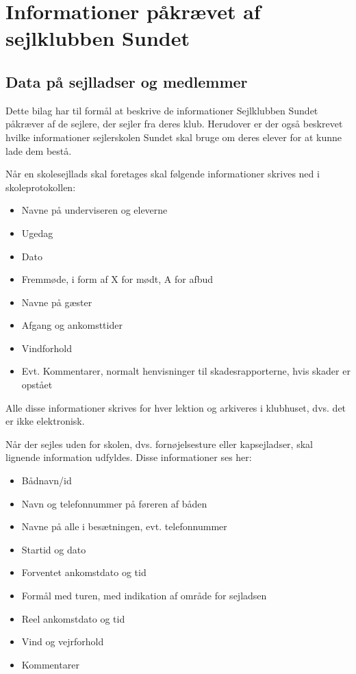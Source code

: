 \chapter{Informationer påkrævet af sejlklubben Sundet}\label{bilag:sundet}
\section{Data på sejlladser og medlemmer}

Dette bilag har til formål at beskrive de informationer Sejlklubben Sundet påkræver af de sejlere, der sejler fra deres klub. 
Herudover er der også beskrevet hvilke informationer sejlerskolen Sundet skal bruge om deres elever for at kunne lade dem bestå.

Når en skolesejllads skal foretages skal følgende informationer skrives ned i skoleprotokollen:

\begin{itemize}
	\item Navne på underviseren og eleverne
	\item Ugedag
	\item Dato
	\item Fremmøde, i form af X for mødt, A for afbud
	\item Navne på gæster
	\item Afgang og ankomsttider
	\item Vindforhold
	\item Evt. Kommentarer, normalt henvisninger til skadesrapporterne, hvis skader er opstået
\end{itemize}

Alle disse informationer skrives for hver lektion og arkiveres i klubhuset, dvs. det er ikke elektronisk.

Når der sejles uden for skolen, dvs. fornøjelsesture eller kapsejladser, skal lignende information udfyldes. 
Disse informationer ses her:

\begin{itemize}
	\item Bådnavn/id
	\item Navn og telefonnummer på føreren af båden
	\item Navne på alle i besætningen, evt. telefonnummer
	\item Startid og dato
	\item Forventet ankomstdato og tid
	\item Formål med turen, med indikation af område for sejladsen
	\item Reel ankomstdato og tid
	\item Vind og vejrforhold
	\item Kommentarer
\end{itemize}

